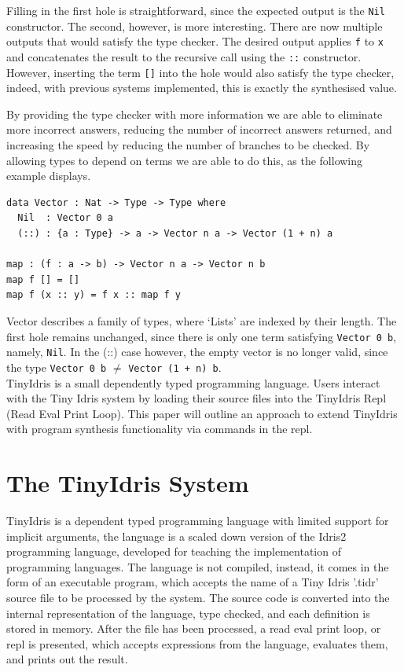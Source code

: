 \documentclass[a4paper]{article}
\begin{document}
Filling in the first hole is straightforward, since the expected output 
is the \texttt{Nil} constructor. The second, however, is more interesting.
There are now multiple outputs that would satisfy the type checker. 
The desired output applies \texttt{f} to \texttt{x} and concatenates the result to the
recursive call using the \texttt{::} constructor. However, inserting the term
\texttt{[]} into the hole would also satisfy the type checker, indeed,
with previous systems implemented, this is exactly the synthesised 
value.

By providing the type checker with more information we are able to 
eliminate more incorrect answers, reducing the number of incorrect 
answers returned, and increasing the speed by reducing the number of 
branches to be checked. By allowing types to depend on terms we are 
able to do this, as the following example displays.

\begin{center}
\begin{verbatim}
data Vector : Nat -> Type -> Type where
  Nil  : Vector 0 a
  (::) : {a : Type} -> a -> Vector n a -> Vector (1 + n) a

map : (f : a -> b) -> Vector n a -> Vector n b
map f [] = []
map f (x :: y) = f x :: map f y
\end{verbatim}
\end{center}

Vector describes a family of types, where `Lists' are indexed
by their length. The first hole remains unchanged, since there is 
only one term satisfying \texttt{Vector 0 b}, namely, \texttt{Nil}.
In the (::) case however, the empty vector is no longer valid,
since the type \texttt{Vector 0 b} \(\neq\) \texttt{Vector (1 + n) b}. \\

TinyIdris is a small dependently typed programming language.
Users interact with the Tiny Idris system by loading their source files
into the TinyIdris Repl (Read Eval Print Loop). This paper will outline 
an approach to extend TinyIdris with program synthesis functionality via
commands in the repl.

\section{The TinyIdris System}
\label{sec:org5c6143c}

TinyIdris is a dependent typed programming language with limited support
for implicit arguments, the language is a scaled down version of the 
Idris2 programming language, developed for teaching the implementation
of programming languages. The language is not compiled, instead, it comes
in the form of an executable program, which accepts the name of a 
Tiny Idris '.tidr' source file to be processed by the system.
The source code is converted into the internal representation of
the language, type checked, and each definition is stored in
memory. After the file has been processed, a read eval print loop, or 
repl is presented, which accepts expressions from the language,
evaluates them, and prints out the result.
\end{document}
